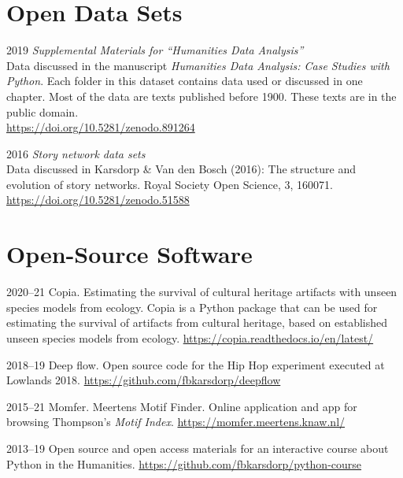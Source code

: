 \documentclass[12pt,letterpaper]{report}
\begin{document}
\section*{Open Data Sets}
\begin{tablist}
\item[2019] \tab{}\textit{Supplemental Materials for ``Humanities Data Analysis''}\\ Data
  discussed in the manuscript \textit{Humanities Data Analysis: Case Studies with Python}.
  Each folder in this dataset contains data used or discussed in one chapter. Most of the
  data are texts published before 1900. These texts are in the public domain. \\
  \url{https://doi.org/10.5281/zenodo.891264}
\item[2016] \tab{}\textit{Story network data sets} \\
  Data discussed in Karsdorp \& Van den Bosch (2016): The structure and evolution of story
  networks. Royal Society Open Science, 3, 160071.
  \url{https://doi.org/10.5281/zenodo.51588} 
\end{tablist}

\section*{Open-Source Software}
\begin{tablist}
  \item[2020--21] \tab{}Copia. Estimating the survival of cultural heritage artifacts with
    unseen species models from ecology. Copia is a Python package that can be used for
    estimating the survival of artifacts from cultural heritage, based on established
    unseen species models from ecology. \url{https://copia.readthedocs.io/en/latest/}
  \item[2018--19] \tab{}Deep flow. Open source code for the Hip Hop experiment executed at
    Lowlands 2018. \url{https://github.com/fbkarsdorp/deepflow}
  \item[2015--21] \tab{}Momfer. Meertens Motif Finder. Online application and app for
    browsing Thompson's \textit{Motif Index}. \url{https://momfer.meertens.knaw.nl/}
  \item[2013--19] \tab{}Open source and open access materials for an interactive course
    about Python in the Humanities. \url{https://github.com/fbkarsdorp/python-course}
\end{tablist}
\end{document}
